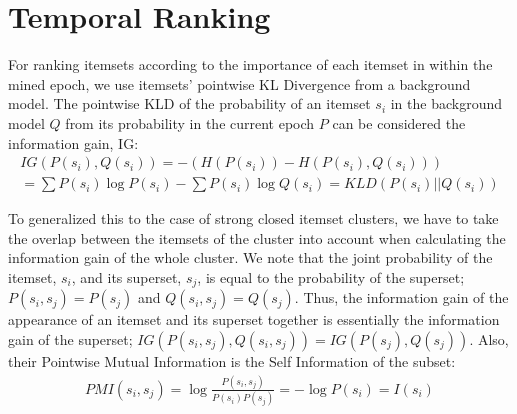 \documentclass{sig-alternate}
\begin{document}
\section{Temporal Ranking}
\label{sec:rank}
For ranking itemsets according to the importance of each itemset in within the mined epoch, we use itemsets' pointwise KL Divergence from a background model. The pointwise KLD of the probability of an itemset $s_i$ in the background model $Q$ from its probability in the current epoch $P$ can be considered the information gain, IG: 
\begin{multline}IG(P(s_i),Q(s_i))  = - (H(P(s_i)) - H(P(s_i),Q(s_i))) \\ = \sum{P(s_i) \log{P(s_i)}} - \sum{P(s_i) \log{Q(s_i)}}  = KLD(P(s_i)||Q(s_i))\end{multline}

To generalized this to the case of strong closed itemset clusters, we have to take the overlap between the itemsets of the cluster into account when calculating the information gain of the whole cluster.
We note that the joint probability of the itemset, $s_i$, and its superset, $s_j$, is equal to the probability of the superset; $P(s_i,s_j) = P(s_j)$ and $Q(s_i,s_j) = Q(s_j)$. 
Thus, the information gain of the appearance of an itemset and its superset together is essentially the information gain of the superset; $IG(P(s_i,s_j),Q(s_i,s_j)) = IG(P(s_j),Q(s_j))$.  Also, their Pointwise Mutual Information is the Self Information of the subset:
\begin{multline}
PMI(s_i, s_j) = \log{ \frac{P(s_i,s_j)}{P(s_i)P(s_j)} } = -\log{P(s_i)} = I(s_i)
\end{multline}
\end{document}
